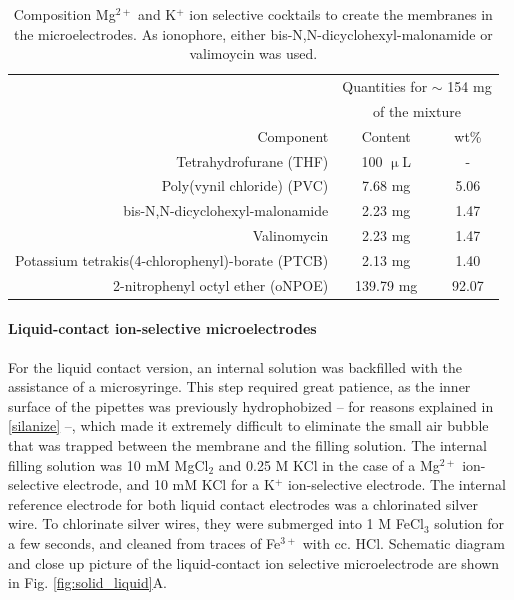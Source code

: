 \begin{table}
                \caption[Composition Mg$^{2+}$ and K$^+$ ion selective cocktails to create the membranes in the microelectrodes.]{Composition Mg$^{2+}$ and K$^+$ ion selective cocktails to create the membranes in the microelectrodes.
As ionophore, either bis-N,N-dicyclohexyl-malonamide or valimoycin was used.}
                \label{table:cocktail}
                \centering
                \begin{tabular}{r c c}
			& \multicolumn{2}{c}{Quantities for $\sim$ 154 mg}\\
			& \multicolumn{2}{c}{of the mixture}\\
			\cline{2-3}
                        Component & Content & wt\% \\
                        \hline
                        Tetrahydrofurane (THF) & 100 $\upmu$L & - \\
                        Poly(vynil chloride) (PVC) & 7.68 mg & 5.06 \\
                        bis-N,N-dicyclohexyl-malonamide & 2.23 mg & 1.47 \\
			Valinomycin & 2.23 mg & 1.47 \\
                        Potassium tetrakis(4-chlorophenyl)-borate (PTCB) & 2.13 mg & 1.40 \\
			2-nitrophenyl octyl ether (oNPOE) & 139.79 mg & 92.07 \\
                \end{tabular}
\end{table}

				\paragraph{Liquid-contact ion-selective microelectrodes}
For the liquid contact version, an internal solution was backfilled with the assistance of a microsyringe.
This step required great patience, as the inner surface of the pipettes was previously hydrophobized -- for reasons explained in \ref{silanize} --, which made it extremely difficult to eliminate the small air bubble that was trapped between the membrane and the filling solution.
The internal filling solution was 10 mM MgCl$_2$ and 0.25 M KCl in the case of a Mg$^{2+}$ ion-selective electrode, and 10 mM KCl for a K$^+$ ion-selective electrode.
The internal reference electrode for both liquid contact electrodes was a chlorinated silver wire.
To chlorinate silver wires, they were submerged into 1 M FeCl$_3$ solution for a few seconds, and cleaned from traces of Fe$^{3+}$ with cc. HCl.
Schematic diagram and close up picture of the liquid-contact ion selective microelectrode are shown in Fig. \ref{fig:solid_liquid}A.


